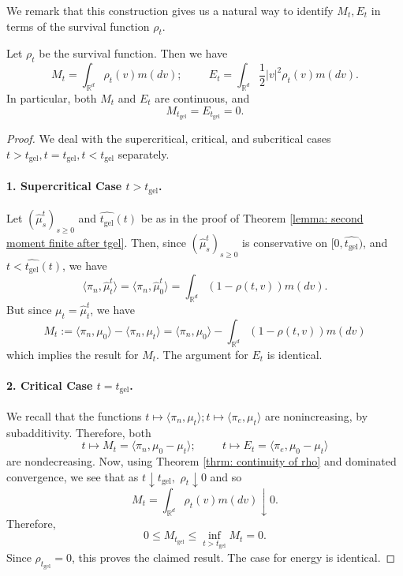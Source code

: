 We remark that this construction gives us a natural way to identify $M_t, E_t$ in terms of the survival function $\rho_t$. \begin{lemma}\label{lemma: representation of M, E} Let $\rho_t$ be the survival function. Then we have \begin{equation}\label{eq: formula for M, E}
    M_t = \int_{\mathbb{R}^d} \rho_t(v)m(dv); \hspace{1cm} E_t=\int_{\mathbb{R}^d} \frac{1}{2}|v|^2\rho_t(v)m(dv).
\end{equation} In particular, both $M_t$ and $E_t$ are continuous, and \begin{equation}
    M_{t_\text{gel}}=E_{t_\text{gel}}=0.
\end{equation} \end{lemma} \begin{proof} We deal with the supercritical, critical, and subcritical cases $t>t_\text{gel}, t=t_\text{gel}, t<t_\text{gel}$ separately. 
\paragraph{1. Supercritical Case $t>t_\text{gel}$.}  Let $(\widehat{\mu}^t_s)_{s\geq 0}$ and $\widehat{t_\text{gel}}(t)$ be as in the proof of Theorem \ref{lemma: second moment finite after tgel}. Then, since $(\widehat{\mu}^t_s)_{s\geq 0}$ is conservative on $[0, \widehat{t_\text{gel}})$, and $t<\widehat{t_\text{gel}}(t)$, we have \begin{equation}
    \langle \pi_n, \widehat{\mu}^t_t\rangle =\langle \pi_n, \widehat{\mu}^t_0\rangle = \int_{\mathbb{R}^d} (1-\rho(t,v))m(dv).
\end{equation} But since $\mu_t=\widehat{\mu}^t_t$, we have \begin{equation}
    M_t:=\langle \pi_n, \mu_0\rangle -\langle \pi_n, \mu_t\rangle =\langle \pi_n, \mu_0\rangle - \int_{\mathbb{R}^d} (1-\rho(t,v))m(dv)
\end{equation} which implies the result for $M_t$. The argument for $E_t$ is identical. 
\paragraph{2. Critical Case $t=t_\text{gel}$.} We recall  that the functions $t\mapsto \langle \pi_n, \mu_t\rangle; t\mapsto \langle \pi_e, \mu_t\rangle$ are nonincreasing, by subadditivity. Therefore, both \begin{equation}
    t\mapsto M_t=\langle \pi_n, \mu_0-\mu_t\rangle;\hspace{1cm}  t\mapsto E_t=\langle \pi_e, \mu_0-\mu_t\rangle 
\end{equation} are nondecreasing. Now, using Theorem \ref{thrm: continuity of rho} and dominated convergence, we see that as $t\downarrow t_\text{gel},$ $\rho_t\downarrow 0$ and so \begin{equation}
    M_t =\int_{\mathbb{R}^d} \rho_t(v)m(dv) \downarrow 0. 
\end{equation} Therefore, \begin{equation}
    0 \leq M_{t_\text{gel}} \leq \inf_{t>t_\text{gel}} M_t = 0. 
\end{equation} Since $\rho_{t_\text{gel}}=0$, this proves the claimed result. The case for energy is identical.

\end{proof}
